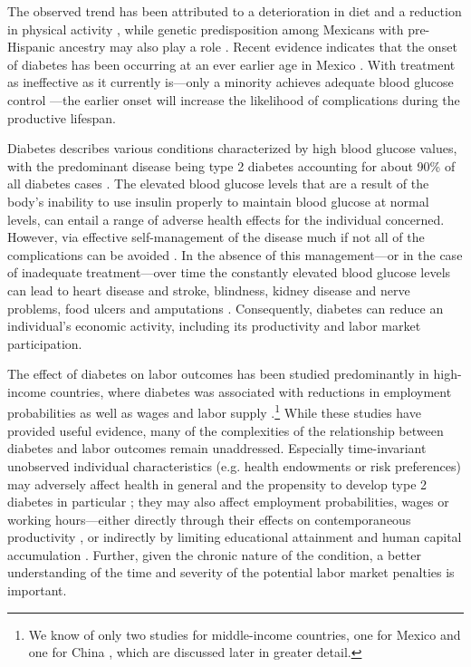 \documentclass[12pt,english]{article}
\begin{document}
The observed trend has been attributed to a deterioration in diet and a reduction in physical activity \parencite{Barquera2008b,Basu2013}, while genetic predisposition among Mexicans with pre-Hispanic ancestry may also play a role \parencite{Williams2013}. Recent evidence indicates that the onset of diabetes has been occurring at an ever earlier age in Mexico \parencite{Bello-Chavolla2017a}. With treatment as ineffective as it currently is---only a minority achieves adequate blood glucose control \parencite{Barquera2013}---the earlier onset will increase the likelihood of complications during the productive lifespan. 

Diabetes describes various conditions characterized by high blood glucose values, with the predominant disease being type 2 diabetes accounting for about 90\% of all diabetes cases \parencite{Sicree2009}. The elevated
blood glucose levels that are a result of the body's inability to use insulin properly to maintain blood glucose at normal levels, can entail a range of adverse health effects for the individual concerned. However, via effective self-management of the disease much if not all of the complications can be avoided \parencite{Lim2011, Gregg2012}. In the absence of this management---or in the case of inadequate treatment---over time the constantly elevated blood glucose levels can lead to heart disease and stroke, blindness, kidney disease and nerve problems, food ulcers and amputations \parencite{Reynoso-Noveron2011}. Consequently, diabetes can reduce an individual's economic activity, including its productivity and labor market participation.

The effect of diabetes on labor outcomes has been studied predominantly in high-income countries, where diabetes was associated with reductions in employment probabilities as well as wages and labor supply \parencite{Brown2005,Brown2014,BrownIII2011,Minor2011,Minor2013,Minor2015,Latif2009,Seuring2015a}.\footnote{We know of only two studies for middle-income countries, one for Mexico \parencite{Seuring2015} and one for China \parencite{Liu2014}, which are discussed later in greater detail.} While these studies have provided useful evidence, many of the complexities of the relationship between diabetes and labor outcomes remain unaddressed. Especially time-invariant unobserved individual characteristics (e.g. health endowments or risk preferences) may adversely affect health in general and the propensity to develop type 2 diabetes in particular \parencite{VanEwijk2011,Sotomayor2013,Li2010b}; they may also affect employment probabilities, wages or working hours---either directly through their effects on contemporaneous productivity \parencite{Currie2013}, or indirectly by limiting educational attainment and human capital accumulation \parencite{Ayyagari2011a}. Further, given the chronic nature of the condition, a better understanding of the time and severity of the potential labor market penalties is important. 
\end{document}
